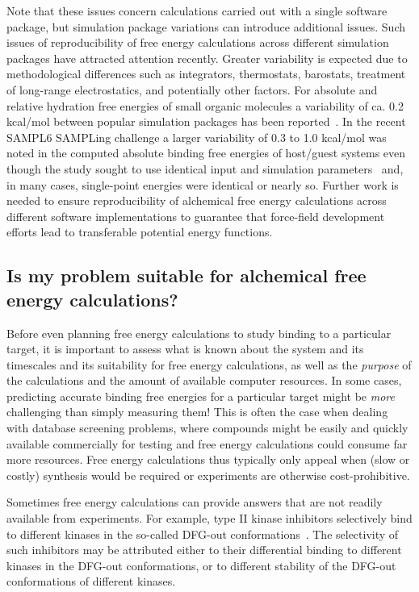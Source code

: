 \documentclass[9pt,bestpractices]{livecoms}
\begin{document}
Note that these issues concern calculations carried out with a single software package, but simulation package variations can introduce additional issues. Such issues of reproducibility of free energy calculations across different simulation packages have attracted attention recently. Greater variability is expected due to methodological differences such as integrators, thermostats, barostats, treatment of long-range electrostatics, and potentially other factors. For absolute and relative hydration free energies of small organic molecules a variability of ca. 0.2 kcal/mol between popular simulation packages has been reported~\cite{loeffler2018reproducibility}. In the recent SAMPL6 SAMPLing challenge a larger variability of 0.3 to 1.0 kcal/mol was noted in the computed absolute binding free energies of host/guest systems even though the study sought to use identical input and simulation parameters~\cite{rizzi2019sampl6} and, in many cases, single-point energies were identical or nearly so. Further work is needed to ensure reproducibility of alchemical free energy calculations across different software implementations to guarantee that force-field development efforts lead to transferable potential energy functions. 

\subsection{Is my problem suitable for alchemical free energy calculations?}
\label{subsec:suitability}
Before even planning free energy calculations to study binding to a
particular target, it is important to assess what is known about the
system and its timescales and its suitability for free energy
calculations, as well as the \emph{purpose} of the calculations and
the amount of available computer resources. In some cases, predicting accurate binding free energies for a particular target might be
\emph{more} challenging than simply measuring them! This is
often the case when dealing with database screening problems, where
compounds might be easily and quickly available commercially for
testing and free energy calculations could consume far more resources. Free energy calculations thus typically only
appeal when (slow or costly) synthesis would be required or experiments are otherwise cost-prohibitive.

Sometimes free energy calculations can provide answers that are not
readily available from experiments. For example, type II kinase
inhibitors selectively bind to different kinases in the so-called
DFG-out conformations~\cite{schindler2000structural}. The selectivity of such
inhibitors may be attributed either to their differential binding to
different kinases in the DFG-out conformations, or to different
stability of the DFG-out conformations of different kinases. 
\end{document}
